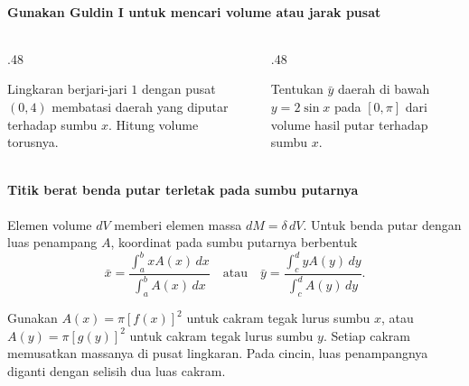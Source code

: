 \documentclass{../../kalkulus-ppt}
\begin{document}
\begin{frame}{\insertsection}
    \framesubtitle{Gunakan Guldin I untuk mencari volume atau jarak pusat}
    \begin{columns}[t,onlytextwidth]
        \begin{column}{.48\textwidth}
            \begin{contoh}
                Lingkaran berjari-jari $1$ dengan pusat $(0,4)$
                membatasi daerah yang diputar terhadap sumbu $x$.
                Hitung volume torusnya.
            \end{contoh}
        \end{column}
        \begin{column}{.48\textwidth}
            \begin{contoh}
                Tentukan $\bar y$ daerah di bawah $y=2\sin x$ pada $[0,\pi]$
                dari volume hasil putar terhadap sumbu $x$.
            \end{contoh}
        \end{column}
    \end{columns}
\end{frame}

\begin{frame}{\insertsection}
    \framesubtitle{Titik berat benda putar terletak pada sumbu putarnya}
    \begin{teorema}
        Elemen volume $dV$ memberi elemen massa $dM=\delta\,dV$.
        Untuk benda putar dengan luas penampang $A$, koordinat pada
        sumbu putarnya berbentuk
        \[
            \bar x=\frac{\int_a^b xA(x)\,dx}{\int_a^b A(x)\,dx}
            \quad\text{atau}\quad
            \bar y=\frac{\int_c^d yA(y)\,dy}{\int_c^d A(y)\,dy}.
        \]
    \end{teorema}
    Gunakan $A(x)=\pi[f(x)]^2$ untuk cakram tegak lurus sumbu $x$,
    atau $A(y)=\pi[g(y)]^2$ untuk cakram tegak lurus sumbu $y$.
    Setiap cakram memusatkan massanya di pusat lingkaran.
    Pada cincin, luas penampangnya diganti dengan selisih dua luas cakram.
\end{frame}
\end{document}
